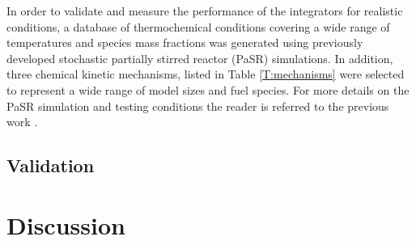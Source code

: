 \documentclass[preprint,12pt]{elsarticle}
\begin{document}
In order to validate and measure the performance of the integrators for realistic conditions, a database of thermochemical conditions covering a wide range of temperatures and species mass fractions was generated using previously developed \cite{Niemeyer:2015ws} stochastic partially stirred reactor (PaSR) simulations.
In addition, three chemical kinetic mechanisms, listed in Table \ref{T:mechanisms} were selected to represent a wide range of model sizes and fuel species.
For more details on the PaSR simulation and testing conditions the reader is referred to the previous work \cite{Niemeyer:2015ws}.

\subsection{Validation}

\section{Discussion}

\pagebreak



\end{document}

